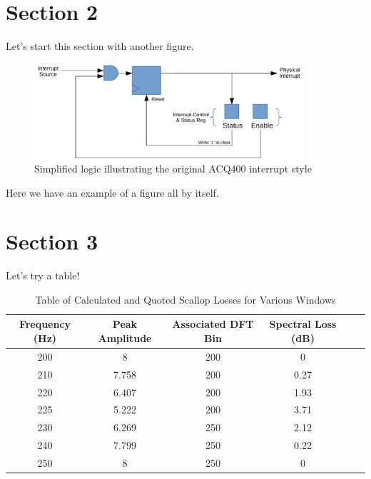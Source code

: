 \documentclass[]{article}
\begin{document}
\section{Section 2}
Let's start this section with another figure.

\begin{figure} [h]
	\centering
	\includegraphics[width=100mm]{images/original_interrupt_style}
	\caption{Simplified logic illustrating the original ACQ400 interrupt style}
	\label{orig_int}
\end{figure}

Here we have an example of a figure all by itself.\\
\lipsum[1]

\section{Section 3}
Let's try a table!

\begin{table}[h]
	\begin{center}
		\begin{tabular}{|c|c|c|c|c|c|}
			
			\hline Frequency (Hz) & Peak Amplitude & Associated DFT Bin & Spectral Loss (dB)\\ 
			\hline 200 & 8 & 200 & 0 \\ 
			\hline 210 & 7.758 & 200 & 0.27 \\ 
			\hline 220 & 6.407 & 200 & 1.93 \\
			\hline 225 & 5.222 & 200 & 3.71 \\
			\hline 230 & 6.269 & 250 & 2.12 \\
			\hline 240 & 7.799 & 250 & 0.22 \\
			\hline 250 & 8 & 250 & 0 \\
			\hline 
		\end{tabular}\\
		\caption{Table of Calculated and Quoted Scallop Losses for Various Windows}
		\label{fig:TableScallop}
	\end{center}
\end{table}
\end{document}
